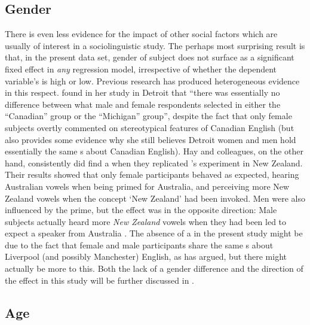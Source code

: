 		\subsection{Gender}
\largerpage
There is even less evidence for the impact of other social factors which are usually of interest in a sociolinguistic study.
The perhaps most surprising result is that, in the present data set, gender of subject does not surface as a significant fixed effect in \emph{any} regression model, irrespective of whether the dependent variable's  is high or low.
Previous research has produced heterogeneous evidence in this respect.
\textcite[69 and 79--80]{niedzielski1999} found in her study in Detroit that ``there was essentially no difference between what male and female respondents selected in either the ``Canadian'' group or the ``Michigan'' group'', despite the fact that only female subjects overtly commented on stereotypical features of Canadian English (but \citeauthor{niedzielski1999} also provides some evidence why she still believes Detroit women and men hold essentially the same s about Canadian English).
Hay and colleagues, on the other hand, consistently did find a  when they replicated \citeauthor{niedzielski1999}'s experiment in New Zealand.
Their results showed that only female participants behaved as expected, hearing Australian vowels when being primed for Australia, and perceiving more New Zealand vowels when the concept `New Zealand' had been invoked.
Men were also influenced by the prime, but the  effect was in the opposite direction: Male subjects actually heard more \emph{New Zealand} vowels when they had been led to expect a speaker from Australia \parencite{hayetal2006a,haydrager2010}.
The absence of a  in the present study might be due to the fact that female and male participants share the same s about Liverpool (and possibly Manchester) English, as \citeauthor{niedzielski1999} has argued, but there might actually be more to this.
Both the lack of a gender difference and the direction of the  effect in this study will be further discussed in .

		\subsection{Age}

